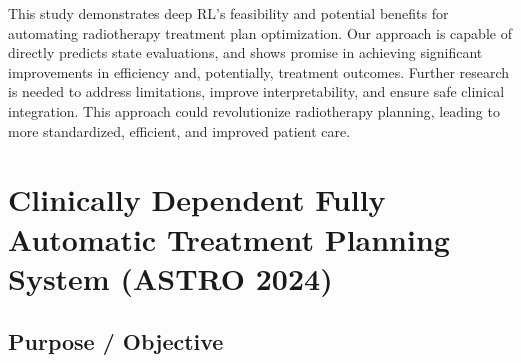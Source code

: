 This study demonstrates deep RL's feasibility and potential benefits for automating radiotherapy treatment plan optimization.
Our approach is capable of directly predicts state evaluations, and shows promise in achieving significant improvements in efficiency and, potentially, treatment outcomes.
Further research is needed to address limitations, improve interpretability, and ensure safe clinical integration.
This approach could revolutionize radiotherapy planning, leading to more standardized, efficient, and improved patient care.






\section{Clinically Dependent Fully Automatic Treatment Planning System (ASTRO 2024)}
\subsection{Purpose / Objective}

